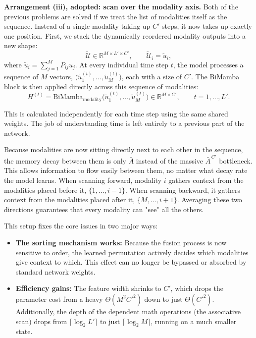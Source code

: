 \documentclass[11pt,a4paper]{article}
\newcommand{\R}{\mathbb{R}}
\begin{document}
	\textbf{Arrangement (iii), adopted: scan over the modality axis.} Both of the previous problems are solved if we treat the list of modalities itself as the sequence. Instead of a single modality taking up $C'$ steps, it now takes up exactly one position. First, we stack the dynamically reordered modality outputs into a new shape: $$\tilde{\mathcal{U}} \in \R^{M \times L' \times C'}, \qquad \tilde{\mathcal{U}}_i = \tilde{u}_i,$$ where $\tilde{u}_i = \sum_{j=1}^{M} P_{ij} u_j$. At every individual time step $t$, the model processes a sequence of $M$ vectors, $\bigl(\tilde{u}_1^{(t)}, \dots, \tilde{u}_M^{(t)}\bigr)$, each with a size of $C'$. The BiMamba block is then applied directly across this sequence of modalities: $$H^{(t)} = \text{BiMamba}_{\text{modality}} \bigl(\tilde{u}_1^{(t)}, \dots, \tilde{u}_M^{(t)}\bigr) \in \R^{M \times C'}, \qquad t = 1,\dots,L'.$$
	
	This is calculated independently for each time step using the same shared weights. The job of understanding time is left entirely to a previous part of the network.

	Because modalities are now sitting directly next to each other in the sequence, the memory decay between them is only $\bar{A}$ instead of the massive $\bar{A}^{\,C'}$ bottleneck. This allows information to flow easily between them, no matter what decay rate the model learns. When scanning forward, modality $i$ gathers context from the modalities placed before it, $\{1,\dots,i-1\}$. When scanning backward, it gathers context from the modalities placed after it, $\{M,\dots,i+1\}$. Averaging these two directions guarantees that every modality can "see" all the others.

	This setup fixes the core issues in two major ways: \begin{itemize}
	    \item \textbf{The sorting mechanism works:} Because the fusion process is now sensitive to order, the learned permutation actively decides which modalities give context to which. This effect can no longer be bypassed or absorbed by standard network weights.
	    \item \textbf{Efficiency gains:} The feature width shrinks to $C'$, which drops the parameter cost from a heavy $\Theta(M^2C'^2)$ down to just $\Theta(C'^2)$. Additionally, the depth of the dependent math operations (the associative scan) drops from $\lceil\log_2 L'\rceil$ to just $\lceil\log_2 M\rceil$, running on a much smaller state.
	\end{itemize}
\end{document}
